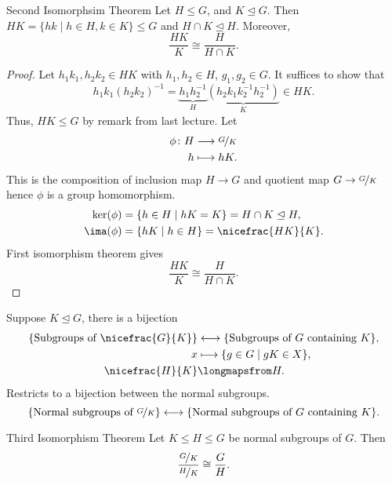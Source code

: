 \begin{theorem}{Second Isomorphsim Theorem}{}
    Let \(H \leq G\), and \(K \trianglelefteq G\). Then \(HK = \{hk \mid h \in H, k\in K\} \leq G\) and \(H \cap K \trianglelefteq H\). Moreover,
    \[
        \frac{HK}{K} \cong \frac{H}{H\cap K}.
    \]
\end{theorem}
\begin{proof}
    Let \(h_1 k_1, h_2 k_2 \in HK\) with \(h_1, h_2 \in H\), \(g_1, g_2 \in G\). It suffices to show that
    \begin{equation*}
        h_1 k_1 (h_2 k_2)^{-1} = \underbrace{h_1 h_2^{-1}}_H \underbrace{(h_2 k_1 k_2^{-1} h_2^{-1})}_K\in HK.
    \end{equation*}
    Thus, \(HK \leq G\) by remark from last lecture. Let
    \begin{equation*}
    \begin{aligned}
      \phi\colon H & \longrightarrow \nicefrac{G}{K}      \\
      h    & \longmapsto hK.
    \end{aligned}
    \end{equation*}
    This is the composition of inclusion map \(H \to G\) and quotient map \(G \to \nicefrac{G}{K}\) hence \(\phi\) is a group homomorphism.
    \begin{align*}
        \ker(\phi) &= \{h\in H\mid hK = K\} = H \cap K \trianglelefteq H,\\
        \ima(\phi) &= \{hK\mid h\in H\} = \nicefrac{HK}{K}.
    \end{align*}
    First isomorphism theorem gives
    \[
        \frac{HK}{K} \cong \frac{H}{H\cap K}.
    \]
\end{proof}
\begin{remark}
    Suppose \(K \trianglelefteq G\), there is a bijection
    \begin{align*}
        \{\text{Subgroups of }\nicefrac{G}{K}\} &\longleftrightarrow\{\text{Subgroups of }G\text{ containing }K\},\\
        x &\longmapsto \{g\in G\mid gK \in X\},\\
        \nicefrac{H}{K}&\longmapsfrom H.
    \end{align*}
    Restricts to a bijection between the normal subgroups.
    \[
        \{\text{Normal subgroups of }\nicefrac{G}{K}\} \longleftrightarrow\{\text{Normal subgroups of }G\text{ containing }K\}.
    \]
\end{remark}
\begin{theorem}{Third Isomorphism Theorem}{}
    Let \(K \leq  H \leq  G\) be normal subgroups of \(G\). Then
    \[
        \frac{\nicefrac{G}{K}}{\nicefrac{H}{K}}\cong \frac{G}{H}.
    \]
\end{theorem}
